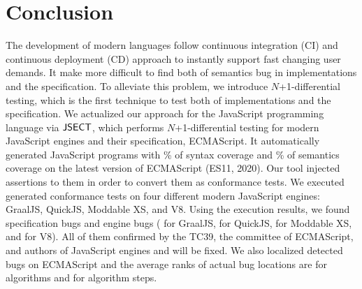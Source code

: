 \section{Conclusion}\label{sec:conclude}
The development of modern languages follow continuous integration (CI) and
continuous deployment (CD) approach to instantly support fast changing user
demands.  It make more difficult to find both of semantics bug in implementations
and the specification.  To alleviate this problem, we introduce
$N$+1-differential testing, which is the first technique to test both of
implementations and the specification.  We actualized our approach for the
JavaScript programming language via $\text{\sf JSECT}$, which performs $N$+1-differential
testing for modern JavaScript engines and their specification, ECMAScript.  It
automatically generated \inred{-} JavaScript programs with \inred{-}\% of syntax
coverage and \inred{-}\% of semantics coverage on the latest version of
ECMAScript (ES11, 2020).  Our tool injected assertions to them in order to
convert them as conformance tests.  We executed generated conformance tests on
four different modern JavaScript engines: GraalJS, QuickJS, Moddable XS, and V8.
Using the execution results, we found \inred{-} specification bugs and
\inred{-} engine bugs (\inred{-} for GraalJS, \inred{-} for QuickJS, \inred{-}
for Moddable XS, and \inred{-} for V8). All of them confirmed by the TC39, the
committee of ECMAScript, and authors of JavaScript engines and will be fixed.
We also localized detected bugs on ECMAScript and the average ranks of actual
bug locations are \inred{-} for algorithms and \inred{-} for algorithm steps.
